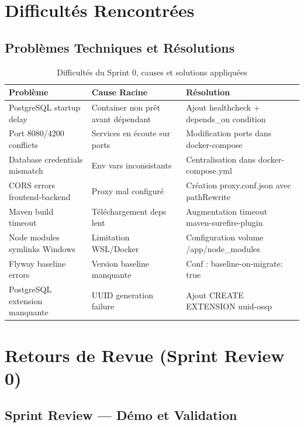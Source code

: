 \documentclass[12pt,a4paper]{report}
\begin{document}
\section{Difficultés Rencontrées}

\subsection{Problèmes Techniques et Résolutions}

\begin{table}[H]
\centering
\caption{Difficultés du Sprint 0, causes et solutions appliquées}
\begin{tabular}{|p{2.5cm}|p{4.5cm}|p{7cm}|}
\hline
\textbf{Problème} & \textbf{Cause Racine} & \textbf{Résolution} \\
\hline
PostgreSQL startup delay & Container non prêt avant dépendant & Ajout healthcheck + depends\_on condition \\
\hline
Port 8080/4200 conflicts & Services en écoute sur ports & Modification ports dans docker-compose \\
\hline
Database credentials mismatch & Env vars inconsistants & Centralisation dans docker-compose.yml \\
\hline
CORS errors frontend-backend & Proxy mal configuré & Création proxy.conf.json avec pathRewrite \\
\hline
Maven build timeout & Téléchargement deps lent & Augmentation timeout maven-surefire-plugin \\
\hline
Node modules symlinks Windows & Limitation WSL/Docker & Configuration volume /app/node\_modules \\
\hline
Flyway baseline errors & Version baseline manquante & Conf : baseline-on-migrate: true \\
\hline
PostgreSQL extension manquante & UUID generation failure & Ajout CREATE EXTENSION uuid-ossp \\
\hline
\end{tabular}
\end{table}

\section{Retours de Revue (Sprint Review 0)}

\subsection{Sprint Review — Démo et Validation}
\end{document}
